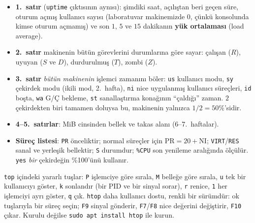 \documentclass[11pt,a4paper]{article}
\newcommand{\term}[1]{\textbf{\color{mintdeep}#1}}
\newcommand{\cmd}[1]{\texttt{#1}}
\begin{document}
\begin{itemize}
  \item \textbf{1.~satır} (\cmd{uptime} çıktısının aynısı): şimdiki saat, açılıştan beri geçen süre, oturum açmış kullanıcı sayısı (laboratuvar makinemizde $0$, çünkü konsolunda kimse oturum açmamış) ve son $1$, $5$ ve $15$ dakikanın \term{yük ortalaması} (load average).
  \item \textbf{2.~satır} makinenin bütün görevlerini durumlarına göre sayar: çalışan ($R$), uyuyan ($S$ ve $D$), durdurulmuş ($T$), zombi ($Z$).
  \item \textbf{3.~satır} \emph{bütün makinenin} işlemci zamanını böler: \texttt{us} kullanıcı modu, \texttt{sy} çekirdek modu (ikili mod, 2.~hafta), \texttt{ni} nice uygulanmış kullanıcı süreçleri, \texttt{id} boşta, \texttt{wa} G/Ç bekleme, \texttt{st} sanallaştırma konağının ``çaldığı'' zaman. $2$ çekirdekten biri tamamen doluysa bu, makinenin yalnızca $1/2 = 50\%$'sidir.
  \item \textbf{4--5.~satırlar}: MiB cinsinden bellek ve takas alanı (6--7.~haftalar).
  \item \textbf{Süreç listesi}: \texttt{PR} önceliktir; normal süreçler için $\text{PR} = 20 + \text{NI}$; \texttt{VIRT}/\texttt{RES} sanal ve yerleşik bellektir; \texttt{S} durumdur; \texttt{\%CPU} son yenileme aralığında ölçülür. \cmd{yes} \emph{bir} çekirdeğin \%100'ünü kullanır.
\end{itemize}

\cmd{top} içindeki yararlı tuşlar: \texttt{P} işlemciye göre sırala, \texttt{M} belleğe göre sırala, \texttt{u} tek bir kullanıcıyı göster, \texttt{k} sonlandır (bir PID ve bir sinyal sorar), \texttt{r} renice, \texttt{1} her işlemciyi ayrı göster, \texttt{q} çık. \cmd{htop} daha kullanıcı dostu, renkli bir sürümdür: ok tuşlarıyla bir süreç seçin; \texttt{F9} sinyal gönderir, \texttt{F7}/\texttt{F8} nice değerini değiştirir, \texttt{F10} çıkar. Kurulu değilse \cmd{sudo apt install htop} ile kurun.
\end{document}
